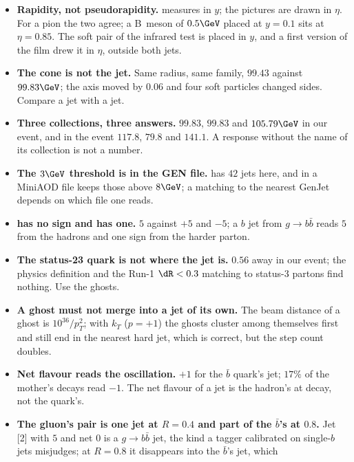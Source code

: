 \begin{pitfalls}
\begin{itemize}[nosep]
  \item \textbf{Rapidity, not pseudorapidity.} \antikt measures \dR in
    $y$; the pictures are drawn in $\eta$. For a pion the two agree; a
    B~meson of $0.5\GeV$ placed at $y=0.1$ sits at $\eta=0.85$. The soft
    pair of the infrared test is placed in $y$, and a first version of
    the film drew it in $\eta$, outside both jets.
  \item \textbf{The cone is not the jet.} Same radius, same family,
    $99.43$ against $99.83\GeV$; the axis moved by $0.06$ and four soft
    particles changed sides. Compare a jet with a jet.
  \item \textbf{Three collections, three answers.} $99.83$, $99.83$ and
    $105.79\GeV$ in our event, and in the \CMSSW event $117.8$, $79.8$ and
    $141.1$. A response without the name of its collection is not a
    number.
  \item \textbf{The $3\GeV$ threshold is in the GEN file.} \akfour has
    $42$ jets here, and  in a MiniAOD file keeps
    those above $8\GeV$; a matching to the nearest GenJet depends on
    which file one reads.
  \item \textbf{\hadflav has no sign and \partflav has one.} $5$ against
    $+5$ and $-5$; a $b$ jet from $g\to b\bar b$ reads $5$ from the
    hadrons and one sign from the harder parton.
  \item \textbf{The status-23 quark is not where the jet is.} $0.56$
    away in our event; the physics definition and the Run-1 $\dR<0.3$
    matching to status-3 partons find nothing. Use the ghosts.
  \item \textbf{A ghost must not merge into a jet of its own.} The beam
    distance of a ghost is $10^{36}/p_T^2$; with $k_T$ ($p=+1$) the
    ghosts cluster among themselves first and still end in the nearest
    hard jet, which is correct, but the step count doubles.
  \item \textbf{Net flavour reads the oscillation.} $+1$ for the
    $\bar b$ quark's jet; $17\%$ of the mother's decays read $-1$. The
    net flavour of a jet is the hadron's at decay, not the quark's.
  \item \textbf{The gluon's pair is one jet at $R=0.4$ and part of the
    $\bar b$'s at $0.8$.} Jet [2] with \hadflav $5$ and net $0$ is a
    $g\to b\bar b$ jet, the kind a tagger calibrated on single-$b$ jets
    misjudges; at $R=0.8$ it disappears into the $\bar b$'s jet, which

\end{itemize}
\end{pitfalls}
